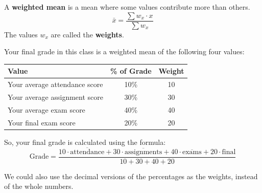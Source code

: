 \documentclass{beamer}
\begin{document}
\begin{frame}
\begin{definition}
A \textbf{weighted mean} is a mean where some values contribute more than others. 
\begin{equation*}
\bar{x}=\dfrac{\sum w_x\cdot x}{\sum w_x}
\end{equation*}
The values $w_x$ are called the \textbf{weights}.
\end{definition}
\end{frame}

\begin{frame}
\begin{example}
Your final grade in this class is a weighted mean of the following four values:
\begin{center}
\begin{tabular}{l|c|c}
Value & \% of Grade & Weight \\\hline
Your average attendance score & 10\% & 10 \\\pause
Your average assignment score & 30\% & 30 \\\pause
Your average exam score & 40\% & 40 \\\pause
Your final exam score & 20\% & 20
\end{tabular}
\end{center}\pause
So, your final grade is calculated using the formula:
\begin{equation*}
\text{Grade} = \dfrac{10\cdot\overline{\text{attendance}} + 30\cdot\overline{\text{assignments}} + 40\cdot\overline{\text{exams}} + 20\cdot\text{final}}{10+30+40+20}
\end{equation*}
\end{example}\pause

\begin{note}
We could also use the decimal versions of the percentages as the weights, instead of the whole numbers.
\end{note}
\end{frame}
\end{document}
